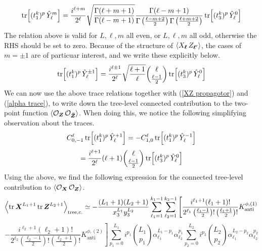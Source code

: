 %
%
\begin{equation}\label{t1 with fuzzy harmonic trace}
\tr[(t_1^k)^p \, \hat{Y}^m_\ell]
=
\frac{i^{\ell+m}}{2^\ell}
\sqrt{\frac{\Gamma(\ell + m + 1)}{\Gamma(\ell-m+1)}}
\frac{\Gamma(\ell-m+1)}
{
\Gamma \left( \frac{\ell-m+2}{2} \right)
\Gamma \left( \frac{\ell+m+2}{2} \right)
}
\tr[(t_3^k)^p \, \hat{Y}^0_\ell]
\end{equation}
%
%
The relation above is valid for $L,\ell,m$ all even, or $L,\ell,m$ all odd, otherwise the RHS should be set to zero. Because of the structure of $\expval{X_{\boldsymbol{\ell}} \, Z_{\boldsymbol{\ell}'}}$, the cases of $m=\pm 1$ are of particuar interest, and we write these explicitly below.
%
%
\begin{equation}
\tr[(t_1^k)^p \, \hat{Y}^{\pm 1}_\ell]
=
\frac{i^{\ell \pm 1}}{2^\ell}
\sqrt{\frac{\ell + 1}{\ell}}
\binom{\ell}{\frac{\ell-1}{2}}
\tr[(t_3^k)^p \, \hat{Y}^0_\ell]
\end{equation}
%
%
We can now use the above trace relations together with (\ref{XZ propagotor}) and (\ref{alpha trace}), to write down the tree-level connected contribution to the two-point function $\expval{\mathcal{O}_{\boldsymbol{Z}} \, \mathcal{O}_{\boldsymbol{\bar{Z}}}}$. When doing this, we notice the following simplifying observation about the traces.
%
%
\begin{equation*}
C^\ell_{0,-1} \tr[(t_1^k)^p \, \hat{Y}^{+1}_\ell]
=
-C^\ell_{1,0} \tr[(t_1^k)^p \, \hat{Y}^{-1}_\ell]
\end{equation*}
%
%
\begin{equation}
=
\frac{i^{\ell + 1}}{2^\ell}
(\ell + 1)
\binom{\ell}{\frac{\ell-1}{2}}
\tr[(t_3^k)^p \, \hat{Y}^0_\ell]
\end{equation}
%
%
Using the above, we find the following expression for the connected tree-level contribution to $\expval{\mathcal{O}_{\boldsymbol{X}} \, \mathcal{O}_{\boldsymbol{Z}}}$.
%
%
\begin{equation*}
\expval{\tr \boldsymbol{X}^{L_1+1} \tr \boldsymbol{Z}^{L_2+1}}_{\mathrm{tree,c.}}
\simeq
-\frac{(L_1 + 1) (L_2 + 1)}{x_3^{L_1} y_3^{L_2}}
\sum_{\ell_1=1}^{k_1-1}
\sum_{\ell_2=1}^{k_2-1}
\left[
\frac{i^{\ell_1+1}
(\ell_1 + 1)!}
{2^{\ell_1}
\left( \frac{\ell_1 - 1}{2} \right)!
\left( \frac{\ell_1 + 1}{2} \right)!}
K^{\phi,(1)}_{\mathrm{anti}}
\right.
\end{equation*}
%
%
\begin{equation}
\left.
-
\frac{i^{\ell_2+1}
(\ell_2 + 1)!}
{2^{\ell_2}
\left( \frac{\ell_2 - 1}{2} \right)!
\left( \frac{\ell_2 + 1}{2} \right)!}
K^{\phi,(2)}_{\mathrm{anti}}
\right]
\sum_{p_1=0}^{L_1} i^{p_1}
\binom{L_1}{p_1}
\alpha_{\ell_1}^{L_1-p_1} \alpha_{\ell_2}^{p_1}
\sum_{p_2=0}^{L_2} i^{p_2}
\binom{L_2}{p_2}
\alpha_{\ell_1}^{L_2-p_2} \alpha_{\ell_2}^{p_2}
\end{equation}

